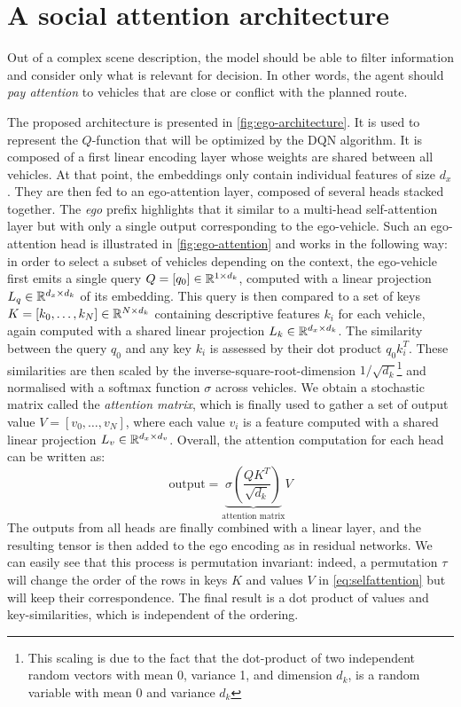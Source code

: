 \section{A social attention architecture}
\label{sec:architecture}

Out of a complex scene description, the model should be able to filter information and consider only what is relevant for decision. In other words, the agent should \emph{pay attention} to vehicles that are close or conflict with the planned route. 

The proposed architecture is presented in \autoref{fig:ego-architecture}. It is used to represent the $Q$-function that will be optimized by the DQN algorithm. It is composed of a first linear encoding layer whose weights are shared between all vehicles. At that point, the embeddings only contain individual features of size $d_x$. They are then fed to an ego-attention layer, composed of several heads stacked together. The \emph{ego} prefix highlights that it similar to a multi-head self-attention layer \citep{Vaswani2017} but with only a single output corresponding to the ego-vehicle. Such an ego-attention head is illustrated in \autoref{fig:ego-attention} and works in the following way: in order to select a subset of vehicles depending on the context, the ego-vehicle  first emits a single query $Q = [q_0]\in\mathbb{R}^{1 \times d_k}$, computed with a linear projection $L_q\in\mathbb{R}^{d_x \times d_k}$ of its embedding. This query is then compared to a set of keys $K = [k_0, \dots, k_N]\in\mathbb{R}^{N \times d_k}$ containing descriptive features $k_i$ for each vehicle, again computed with a shared linear projection $L_k\in\mathbb{R}^{d_x \times d_k}$. The similarity between the query $q_0$ and any key $k_i$ is assessed by their dot product $q_0 k_i^T$. These similarities are then scaled by the inverse-square-root-dimension $1/\sqrt{d_k}$\footnote{This scaling is due to the fact that the dot-product of two independent random vectors with mean 0,  variance 1, and dimension $d_k$, is a random variable with mean 0 and variance $d_k$} and normalised with a softmax function $\sigma$ across vehicles. We obtain a stochastic matrix called the \emph{attention matrix}, which is finally used to gather a set of output value $V = [v_0, \dots, v_N]$, where each value $v_i$ is a feature computed with a shared linear projection $L_v\in\mathbb{R}^{d_x \times d_v}$. Overall, the attention computation for each head can be written as:
\begin{equation}
\text{output}=\underbrace{\sigma\left(\frac{QK^T}{\sqrt{d_k}}\right)}_{\text{attention matrix}}V
\label{eq:selfattention}
\end{equation}
The outputs from all heads are finally combined with a linear layer, and the resulting tensor is then added to the ego encoding as in residual networks. We can easily see that this process is permutation invariant: indeed, a permutation $\tau$ will change the order of the rows in keys $K$ and values $V$ in \eqref{eq:selfattention} but will keep their correspondence. The final result is a dot product of values and key-similarities, which is independent of the ordering.


